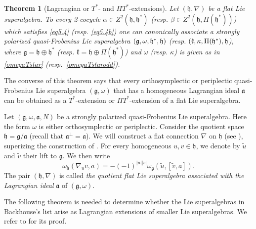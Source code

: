 \documentclass[12pt]{amsart}
\newtheorem{Theorem}{Theorem}[section]
\newcommand{\fa}{\mathfrak{a}}
\newcommand{\fg}{\mathfrak{g}}
\newcommand{\fh}{\mathfrak{h}}
\begin{document}
\begin{Theorem} [Lagrangian or $T^*$- and $\Pi T^*$-extensions] \label{Tstar}
Let $(\fh, \nabla)$ be a flat Lie superalgebra. To every 2-cocycle $\alpha\in Z^2(\mathfrak{h}, \mathfrak{h}^*)$ \textup{(}resp. $\beta\in Z^2(\mathfrak{h}, \Pi(\mathfrak{h}^*))$\textup{)} which satisfies \eqref{eq5.4}  \textup{(}resp. \eqref{eq5.4b}\textup{)} one can canonically associate a strongly polarized quasi-Frobenius Lie superalgebra $\textup{(}\mathfrak{g}, \omega, \mathfrak{h}^*, \mathfrak{h})$ \textup{(}resp. $\textup{(}\mathfrak{k}, \kappa,\Pi(\mathfrak{h}^*), \mathfrak{h}$\textup{)}, where $\mathfrak{g}=\mathfrak{h}\oplus \mathfrak{h}^*$ \textup{(}resp. $\mathfrak{k}=\mathfrak{h}\oplus \Pi(\mathfrak{h}^*)$\textup{)} and $\omega$ \textup{(}resp. $\kappa$\textup{)} is given as in \eqref{omegaTstar} \textup{(}resp.~\eqref{omegaTstarodd}\textup{)}.
\end{Theorem}

The converse of this theorem says that every orthosymplectic or periplectic quasi-Frobenius Lie superalgebra $(\mathfrak{g}, \omega)$ that has a homogeneous Lagrangian ideal $\mathfrak{a}$ can be obtained as a $T^*$-extension  or $\Pi T^*$-extension of a flat Lie superalgebra. 

Let $(\mathfrak{g}, \omega, \mathfrak{a},N)$ be a strongly polarized quasi-Frobenius Lie superalgebra. Here the form $\omega$ is either orthosymplectic or periplectic. Consider the quotient space 
$\mathfrak{h}=\mathfrak{g}/\mathfrak{a}$ (recall that $\fa^\perp=\fa$). We will construct a flat connection $\nabla$ on $\mathfrak{h}$ (see \cite{BM}), superizing the construction of \cite{BC}. For every homogeneous $u,v\in \fh$, we  denote by $\tilde u$ and $\tilde v$ their lift to $\fg$. We then write 
\begin{equation}\label{eq5.5}
\omega_\mathfrak{h}(\nabla_uv, a)= - (-1)^{|u||v|} \omega_\mathfrak{g} (\tilde u, [\tilde v, a]).
\end{equation}
The pair $(\mathfrak{h},\nabla)$ is called {\it the quotient flat Lie superalgebra associated with the Lagrangian ideal} $\mathfrak{a}$ of $(\mathfrak{g}, \omega)$.

The following theorem is needed to determine whether the Lie superalgebras in Backhouse's list arise as Lagrangian extensions of smaller Lie superalgebras. We refer to \cite{BM} for its proof.
\end{document}
